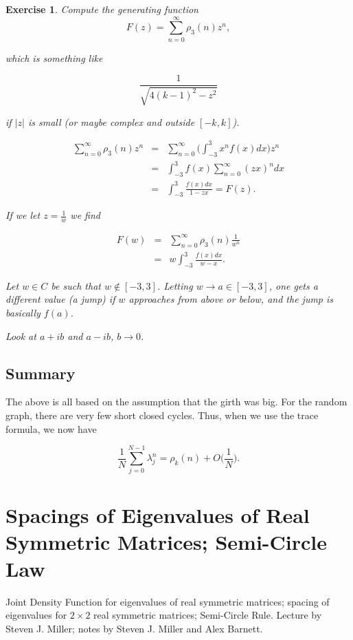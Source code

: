 \documentclass[12pt,letterpaper]{report}
\newcommand\be{\begin{equation}}
\newcommand\ee{\end{equation}}
\newcommand\bea{\begin{eqnarray}}
\newcommand\eea{\end{eqnarray}}
\newtheorem{exe}[thm]{Exercise}
\begin{document}
\begin{exe} Compute the generating function
\be F(z) = \sum_{n=0}^\infty \rho_3(n) z^n, \ee

which is something like

\be \frac{1}{\sqrt{4(k-1)^2 - z^2 } } \ee

if $|z|$ is small (or maybe complex and outside $[-k,k]$).

\bea \sum_{n=0}^\infty \rho_3(n) z^n &=&  \sum_{n=0}^\infty
\Bigg(\int_{-3}^3 x^n f(x)dx \Bigg) z^n \nonumber\\ &=&
\int_{-3}^3 f(x) \sum_{n=0}^\infty (zx)^n dx \nonumber\\ &=&
\int_{-3}^3 \frac{ f(x)dx }{ 1 - zx } = F(z). \eea

If we let $z = \frac{1}{w}$ we find

\bea F(w) &=& \sum_{n=0}^\infty \rho_3(n) \frac{1}{w^n}
\nonumber\\ &=& w \int_{-3}^3 \frac{ f(x) dx }{w - x}. \eea

Let $w \in C$ be such that $w \not\in [-3,3]$. Letting $w \to a
\in [-3,3]$, one gets a different value (a jump) if $w$ approaches
from above or below, and the jump is basically $f(a)$.

Look at $a + ib$ and $a - ib$, $b \to 0$.

\end{exe}

\section{Summary}

The above is all based on the assumption that the girth was big.
For the random graph, there are very few short closed cycles.
Thus, when we use the trace formula, we now have

\be \frac{1}{N} \sum_{j=0}^{N-1} \lambda_j^n = \rho_k(n) + O\Big(
\frac{1}{N} \Big). \ee



\chapter{Spacings of Eigenvalues of Real Symmetric Matrices; Semi-Circle Law}

Joint Density Function for eigenvalues of real symmetric matrices;
spacing of eigenvalues for $2 \times 2$ real symmetric matrices;
Semi-Circle Rule. Lecture by Steven J. Miller; notes by Steven J.
Miller and Alex Barnett.
\end{document}
